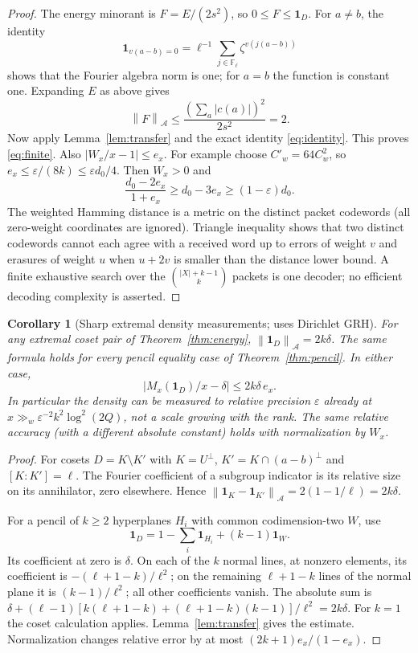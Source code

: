 \documentclass[11pt]{article}
\newtheorem{corollary}[theorem]{Corollary}
\theoremstyle{remark}\newtheorem{remark}[theorem]{Remark}
\newcommand{\F}{\mathbb F}
\newcommand{\1}{\mathbf 1}
\newcommand{\norm}[1]{\left\lVert#1\right\rVert}
\begin{document}
\begin{proof}
The energy minorant is $F=E/(2s^2)$, so $0\le F\le\1_D$. For $a\ne b$, the identity\[\1_{v(a-b)=0}=\ell^{-1}\sum_{j\in\F_\ell}\zeta^{v(j(a-b))}\] shows that the Fourier algebra norm is one; for $a=b$ the function is constant one. Expanding $E$ as above gives
\[
 \norm F_{\mathcal A}\le \frac{(\sum_a|c(a)|)^2}{2s^2}=2.
\]
Now apply Lemma~\ref{lem:transfer} and the exact identity \eqref{eq:identity}. This proves \eqref{eq:finite}. Also $|W_x/x-1|\le e_x$. For example choose $C'_w=64C_w^2$, so $e_x\le\varepsilon/(8k)\le\varepsilon d_0/4$. Then $W_x>0$ and
\[
 \frac{d_0-2e_x}{1+e_x}\ge d_0-3e_x\ge(1-\varepsilon)d_0.
\]
The weighted Hamming distance is a metric on the distinct packet codewords (all zero-weight coordinates are ignored). Triangle inequality shows that two distinct codewords cannot each agree with a received word up to errors of weight $v$ and erasures of weight $u$ when $u+2v$ is smaller than the distance lower bound. A finite exhaustive search over the $\binom{|X|+k-1}{k}$ packets is one decoder; no efficient decoding complexity is asserted.
\end{proof}
\begin{corollary}[Sharp extremal density measurements; uses Dirichlet GRH]\label{cor:measure}
For any extremal coset pair of Theorem~\ref{thm:energy}, $\norm{\1_D}_{\mathcal A}=2k\delta$. The same formula holds for every pencil equality case of Theorem~\ref{thm:pencil}. In either case,
\[
 |M_x(\1_D)/x-\delta|\le 2k\delta\,e_x.
\]
In particular the density can be measured to relative precision $\varepsilon$ already at $x\gg_w\varepsilon^{-2}k^2\log^2(2Q)$, not a scale growing with the rank. The same relative accuracy (with a different absolute constant) holds with normalization by $W_x$.
\end{corollary}
\begin{proof}
For cosets $D=K\setminus K'$ with $K=U^\perp$, $K'=K\cap(a-b)^\perp$ and $[K:K']=\ell$. The Fourier coefficient of a subgroup indicator is its relative size on its annihilator, zero elsewhere. Hence $\norm{\1_K-\1_{K'}}_{\mathcal A}=2(1-1/\ell)=2k\delta$.

For a pencil of $k\ge2$ hyperplanes $H_i$ with common codimension-two $W$, use
\[
 \1_D=1-\sum_i\1_{H_i}+(k-1)\1_W.
\]
Its coefficient at zero is $\delta$. On each of the $k$ normal lines, at nonzero elements, its coefficient is $-(\ell+1-k)/\ell^2$; on the remaining $\ell+1-k$ lines of the normal plane it is $(k-1)/\ell^2$; all other coefficients vanish. The absolute sum is $\delta+(\ell-1)[k(\ell+1-k)+(\ell+1-k)(k-1)]/\ell^2=2k\delta$. For $k=1$ the coset calculation applies. Lemma~\ref{lem:transfer} gives the estimate. Normalization changes relative error by at most $(2k+1)e_x/(1-e_x)$.
\end{proof}
\end{document}
